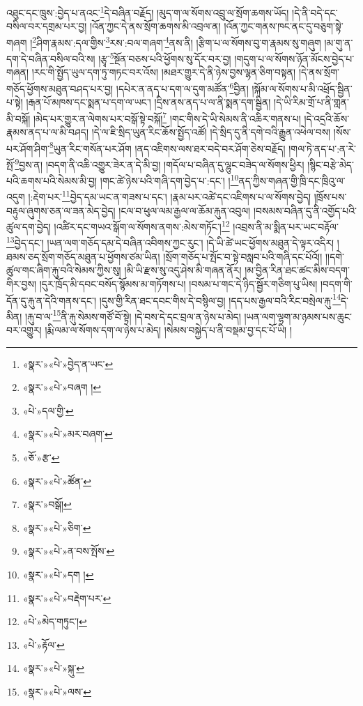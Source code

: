 འཐུང་དང་ཁྲུས་:བྱེད་པ་ནའང་\footnote{«སྣར་»«པེ་»བྱེད་ན་ཡང་}དེ་བཞིན་བརྗོད། །མུད་ག་ལ་སོགས་འབྲུ་ལ་སྲོག་ཆགས་ཡོད། །དེ་ནི་བདེ་དང་བསིལ་བར་དགྲམ་པར་བྱ། །འོན་ཀྱང་དེ་ནས་སྲོག་ཆགས་མི་འབྲལ་ན། །འོན་ཀྱང་གནས་ཁང་ནང་དུ་བཅུག་སྟེ་གཞག །\footnote{«སྣར་»«པེ་»བཞག །}ཤིག་རྣམས་:དལ་གྱིས་\footnote{«པེ་»དལ་གྱི་}རས་:བལ་གཞག་\footnote{«སྣར་»«པེ་»མར་བཞག་}ནས་ནི། །རྩིག་པ་ལ་སོགས་བུ་ག་རྣམས་སུ་གཞུག །མ་གུ་ན་དག་དེ་བཞིན་བསིལ་བའི་ས། །རྩྭ་\footnote{«ཅོ་»རྩ་}སྔོན་བཅས་པའི་ཕྱོགས་སུ་དོར་བར་བྱ། །གདུག་པ་ལ་སོགས་ཉོན་མོངས་བྱེད་པ་གཞན། །རང་གི་སྤྱོད་ཡུལ་དག་ཏུ་གཏང་བར་འོས། །མཐར་གྱུར་དེ་ནི་ཉེས་བྱས་ལྷན་ཅིག་བསྟན། །དེ་ནས་སྲོག་གཅོད་ཕྱོགས་མཐུན་བཤད་པར་བྱ། །དཔེར་ན་ནད་པ་དག་ལ་དུག་མཚོན་\footnote{«སྣར་»«པེ་»ཚོན་}བྱིན། །སྐོམ་ལ་སོགས་པ་མི་འཕྲོད་སྦྱིན་པ་སྟེ། །རྒན་པོ་མཁས་དང་སྨན་པ་དག་ལ་ཡང་། །དྲིས་ནས་ནད་པ་ལ་ནི་སྨན་དག་སྦྱིན། །དེ་ཡི་རིམ་གྲོ་པ་ནི་གླན་མི་བསྐོ། །མེད་པར་གྱུར་ན་ལེགས་པར་བསྒོ་སྟེ་བསྐོ།\footnote{«སྣར་»བསྒོ།} །གང་གིས་དེ་ཡི་སེམས་ནི་འཆིར་གནས་པ། །དེ་འདྲའི་ཆོས་རྣམས་ནད་པ་ལ་མི་བཤད། །དེ་ལ་ཇི་སྲིད་ཡུན་རིང་ཆོས་སྤྱོད་འཚོ། །དེ་སྲིད་དུ་ནི་དགེ་བའི་རྒྱུན་འཕེལ་བས། །སོས་པར་ཤོག་ཤིག་\footnote{«སྣར་»«པེ་»ཅིག་}ཡུན་རིང་གསོན་པར་ཤོག །ནད་འཇིགས་ལས་ཐར་བདེ་བར་ཤོག་ཅེས་བརྗོད། །གལ་ཏེ་ནད་པ་:ན་རེ་སྤོ་\footnote{«སྣར་»«པེ་»ན་བས་སྤོས་}བྱས་ན། །བདག་ནི་འཆི་འགྱུར་ཟེར་ན་དེ་མི་བྱ། །གདོལ་པ་བཞིན་དུ་ལྷུང་བཟེད་ལ་སོགས་ཕྱིར། །སྙིང་བརྩེ་མེད་པའི་ཆགས་པའི་སེམས་མི་བྱ། །གང་ཚེ་ཉེས་པའི་གཞི་དག་བྱེད་པ་:དང་། །\footnote{«སྣར་»«པེ་»དག །}ནད་ཀྱིས་གཞན་གྱི་ཁྲི་དང་ཁྲིའུ་ལ་འདུག །:རྡེག་པར་\footnote{«སྣར་»«པེ་»བརྡེག་པར་}བྱེད་དམ་ཡང་ན་གཟས་པ་དང་། །རྣམ་པར་འཚེ་དང་འཇིགས་པ་ལ་སོགས་བྱེད། །ཁྲོས་པས་བརྟུལ་ཞུགས་ཅན་ལ་ཟན་མེད་བྱེད། །ངལ་བ་ཕུལ་ལམ་རྒྱལ་ལ་ཆོམ་རྐུན་འབུལ། །བསམས་བཞིན་དུ་ནི་འགྱོད་པའི་ཚུལ་དག་བྱེད། །འཚིར་དང་གཡའ་སྒོག་ལ་སོགས་ནགས་:མེས་གཏོང་།\footnote{«པེ་»མེད་གཏུང་།} །འབྲས་ནི་མ་སྨིན་པར་ཡང་བརྟོལ་\footnote{«པེ་»རྟོལ་}བྱེད་དང་། །ཡན་ལག་གཅོད་དམ་དེ་བཞིན་འབིགས་ཀྱང་རུང་། །དེ་ཡི་ཚེ་ཡང་ཕྱོགས་མཐུན་དེ་ལྟར་འདིར། །ཐམས་ཅད་སྲོག་གཅོད་མཐུན་པ་ཕྱོགས་ཙམ་ཡིན། །སྲོག་གཅོད་པ་སྤོང་བ་སྟེ་བསླབ་པའི་གཞི་དང་པོའོ།། །།དགེ་ཚུལ་གང་ཞིག་རྐུ་བའི་སེམས་ཀྱིས་སུ། །མི་ཡི་རྫས་སུ་འདུ་ཤེས་མི་གཞན་ནོར། །མ་བྱིན་རིན་ཐང་ཚང་མིས་བདག་གིར་བྱས། །དུར་ཁྲོད་མི་དབང་བསོད་སྙོམས་མ་གཏོགས་པ། །བསམ་པ་གང་དེ་ཉིད་སྦྱོར་གཅིག་པུ་ཡིས། །བདག་གི་དོན་དུ་རྐུ་ན་དེའི་གནས་དང་། །དུས་གྱི་རིན་ཐང་དབང་གིས་དེ་བསྙིལ་བྱ། །དད་པས་རྒྱལ་བའི་རིང་བསྲེལ་རྐུ་\footnote{«སྣར་»«པེ་»སྐུ་}དེ་མིན། །རྐུ་བ་ལ་\footnote{«སྣར་»«པེ་»ལས་}ནི་རྐུ་སེམས་གཙོ་བོ་སྟེ། །དེ་བས་དེ་དང་བྲལ་ན་ཉེས་པ་མེད། །ཡན་ལག་ལྷག་མ་ཉམས་པས་ཆུང་བར་འགྱུར། །རྨི་ལམ་ལ་སོགས་དག་ལ་ཉེས་པ་མེད། །སེམས་བསྐྱེད་པ་ནི་བསྡམ་བྱ་དང་པོ་ཡི། །

